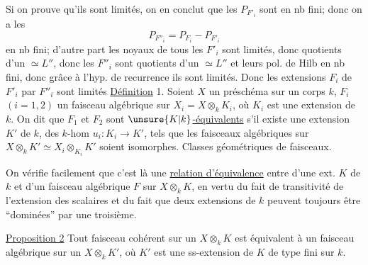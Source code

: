 Si on prouve qu'ils sont limités, on en conclut que les  $P_{F'_i}$ sont en nb fini; donc on a les
\[
P_{F''_i}=P_{F_i}-P_{F'_i}
\]
en nb fini; d'autre part les noyaux de tous les $F'_i$ sont limités, donc quotients d'un $\simeq L''$, donc les $F''_i$ sont quotients d'un $\simeq L''$ et leurs pol. de Hilb en nb fini, donc  grâce à l'hyp. de recurrence ils sont limités. Donc les extensions $F_i$ de $F'_i$ par $F''_i$ sont limités
\uline{Définition} 1. Soient $X$ un préschéma  sur un corps $k$, $F_i$  $(i=1,2)$ un faisceau algébrique sur $X_i=X\otimes_kK_i$, où $K_i$ est une extension de $k$. On dit que $F_1$ et $F_2$ sont \uline{$\unsure{K|k}$-équivalents} s'il existe une extension $K'$ de $k$, des $k$-hom $u_i:K_i\longrightarrow K'$, tels que  les faisceaux algébriques  sur $X\otimes_kK'\simeq X_i\otimes_{K_i}K'$ soient isomorphes.  Classes géométriques de faisceaux.

On vérifie facilement que c'est là une \uline{relation d'équivalence} entre  d'une ext. $K$ de $k$ et d'un faisceau algébrique $F$ sur $X\otimes_kK$, en vertu du fait de transitivité de l'extension des scalaires et du fait que deux extensions de $k$ peuvent toujours être ``dominées'' par une troisième.

\uline{Proposition 2}  Tout faisceau cohérent sur un $X\otimes_kK$ est équivalent à un faisceau algébrique sur un $X\otimes_kK'$, où $K'$ est une ss-extension de $K$ de type fini sur $k$.

